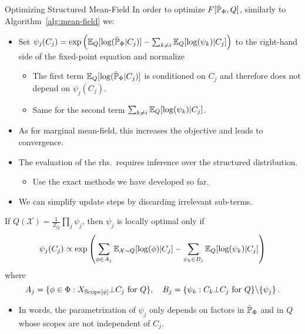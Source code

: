 \begin{frame}{Optimizing Structured Mean-Field}
In order to optimize $F[\tilde{\Pb}_{\Phi},Q]$, similarly to Algorithm~\ref{alg:mean-field} we:
\begin{itemize}
    \pause \item Set $\psi_j(C_j) = \exp\left( \E_Q[\log(\tilde{\Pb}_{\Phi} | C_j)] - \sum_{k \neq i} \E_Q[\log(\psi_k) | C_j] \right)$ to the right-hand side of the fixed-point equation and normalize
    \begin{itemize}
        \pause \item The first term $\E_Q[\log(\tilde{\Pb}_{\Phi} | C_j)]$ is conditioned on $C_j$ and therefore does not depend on $\psi_j(C_j)$.
        \pause \item Same for the second term $\sum_{k \neq i} \E_Q[\log(\psi_k) | C_j]$.
    \end{itemize}
    \pause \item As for marginal mean-field, this increases the objective and leads to convergence.
    \pause \item The evaluation of the rhs.\ requires inference over the structured distribution.
    \begin{itemize}
        \pause \item Use the exact methods we have developed so far.
    \end{itemize}
    \pause \item We can simplify update steps by discarding irrelevant sub-terms.
\end{itemize}
\pause
\begin{theorem}
If $Q(\mathcal{X}) = \frac{1}{Z_Q} \prod_j \psi_j$, then $\psi_j$ is locally optimal only if
\begin{equation}
    \psi_j(C_j) \propto \exp \left(
        \sum_{\phi \in A_j} \E_{\mathcal{X} \sim Q} [ \log(\phi) | C_j] - \sum_{\psi_k \in B_j} \E_Q[\log(\psi_k) | C_j]
        \right)
\end{equation}
where 
\begin{equation}
    A_j = \{\phi \in \Phi : X_{\Scope[\phi]} \indep C_j \text{ for } Q\}, \quad
    B_j = \{\psi_k : C_k \indep C_j \text{ for } Q\} \backslash \{\psi_j\}\,.
\end{equation}
\end{theorem}
\begin{itemize}
    \pause \item In words, the parametrization of $\psi_j$ only depends on factors in $\tilde{\Pb}_{\Phi}$ and in $Q$ whose scopes are not independent of $C_j$.
\end{itemize}
\end{frame}

